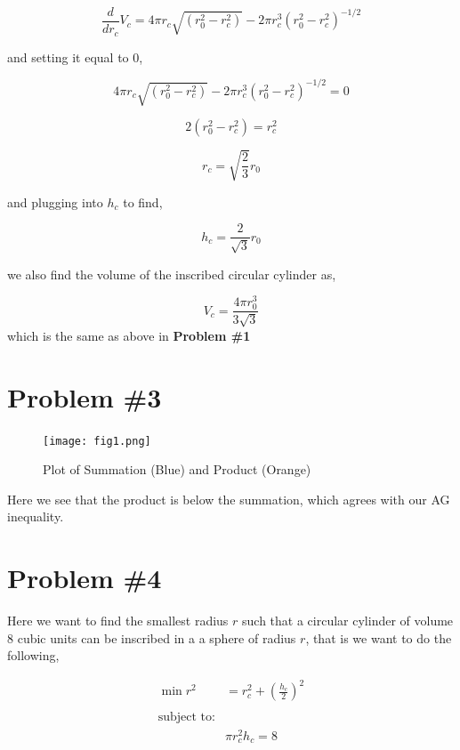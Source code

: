 \documentclass{article}
\begin{document}
\begin{equation*}
    \frac{d}{dr_c}V_c = 4\pi r_c\sqrt{(r_0^2-r_c^2)} -2\pi r_c^3(r_0^2-r_c^2)^{-1/2}
\end{equation*}

and setting it equal to $0$,

\begin{equation*}
    4\pi r_c\sqrt{(r_0^2-r_c^2)} -2\pi r_c^3(r_0^2-r_c^2)^{-1/2} = 0
\end{equation*}

\begin{equation*}
    2(r_0^2-r_c^2) = r_c^2
\end{equation*}

\begin{equation*}
    r_c = \sqrt{\frac{2}{3}}r_0
\end{equation*}

and plugging into $h_c$ to find,

\begin{equation*}
    h_c = \frac{2}{\sqrt{3}}r_0
\end{equation*}

we also find the volume of the inscribed circular cylinder as,

\begin{equation*}
    V_c = \frac{4\pi r_0^3}{3\sqrt{3}}
\end{equation*}
which is the same as above in \textbf{Problem \#1}

\section*{Problem \#3}

\begin{figure}[H]
    \centering
    \texttt{[image: fig1.png]}
    \caption{Plot of Summation (Blue) and Product (Orange)}
    \label{fig:my_label}
\end{figure}

Here we see that the product is below the summation, which agrees with our AG inequality.

\section*{Problem \#4}
Here we want to find the smallest radius $r$ such that a circular cylinder of volume $8$ cubic units can be inscribed in a a sphere of radius $r$, that is we want to do the following,

\begin{align*}
    \min{r^2} &= r_c^2 + \left(\frac{h_c}{2}\right)^2\\ \\
    \text{subject to:}\\
    &\pi r_c^2h_c = 8\\
\end{align*}
\end{document}
